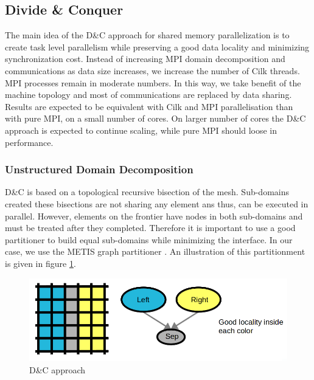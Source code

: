 \documentclass{IOS-Book-Article}
\begin{document}
\subsection{Divide \& Conquer}
The main idea of the D\&C approach for shared memory parallelization is to create task level parallelism while preserving a good data locality and minimizing synchronization cost.
Instead of increasing MPI domain decomposition and communications as data size increases, we increase the number of Cilk threads. MPI processes remain in moderate numbers.
In this way, we take benefit of the machine topology and most of communications are replaced by data sharing.
Results are expected to be equivalent with Cilk and MPI parallelisation than with pure MPI, on a small number of cores.
On larger number of cores the D\&C approach is expected to continue scaling, while pure MPI should loose in performance.

\subsubsection{Unstructured Domain Decomposition}
D\&C is based on a topological recursive bisection of the mesh. Sub-domains created these bisections are not sharing any element ans thus, can be executed in parallel.
However, elements on the frontier have nodes in both sub-domains and must be treated after they completed.
Therefore it is important to use a good partitioner to build equal sub-domains while minimizing the interface. In our case, we use the METIS graph partitioner \cite{Metis}.
An illustration of this partitionment is given in figure \ref{fig:DCapp}.
\begin{figure}[htp]
 \centering
 \includegraphics[scale=0.25]{DC_approach.png}
 \caption{D\&C approach}
 \label{fig:DCapp}
\end{figure}
 
\end{document}
